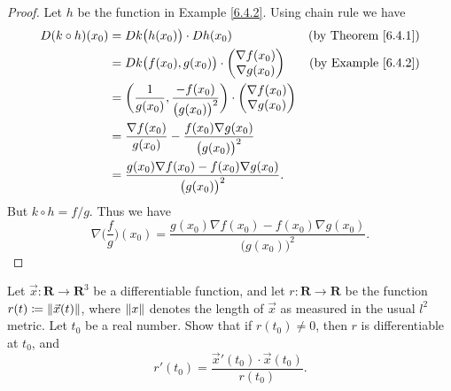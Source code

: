 \begin{proof}
    Let \(h\) be the function in Example \ref{6.4.2}.
    Using chain rule we have
    \begin{align*}
        D (k \circ h)(x_0) & = D k\big(h(x_0)\big) \cdot D h(x_0)                                                                & \text{(by Theorem \ref{6.4.1})} \\
                           & = D k\big(f(x_0), g(x_0)\big) \cdot \begin{pmatrix}
            \nabla f(x_0) \\
            \nabla g(x_0)
        \end{pmatrix}                                      & \text{(by Example \ref{6.4.2})} \\
                           & = \bigg(\frac{1}{g(x_0)}, \frac{-f(x_0)}{\big(g(x_0)\big)^2}\bigg) \cdot \begin{pmatrix}
            \nabla f(x_0) \\
            \nabla g(x_0)
        \end{pmatrix}                                   \\
                           & = \frac{\nabla f(x_0)}{g(x_0)} - \frac{f(x_0) \nabla g(x_0)}{\big(g(x_0)\big)^2}                                                      \\
                           & = \frac{g(x_0) \nabla f(x_0) - f(x_0) \nabla g(x_0)}{\big(g(x_0)\big)^2}.
    \end{align*}
    But \(k \circ h = f / g\).
    Thus we have
    \[
        \nabla \bigg(\frac{f}{g}\bigg)(x_0) = \frac{g(x_0) \nabla f(x_0) - f(x_0) \nabla g(x_0)}{\big(g(x_0)\big)^2}.
    \]
\end{proof}

\begin{exercise}\label{ex 6.4.5}
    Let \(\vec{x} : \mathbf{R} \to \mathbf{R}^3\) be a differentiable function, and let \(r : \mathbf{R} \to \mathbf{R}\) be the function \(r(t) \coloneqq \norm*{\vec{x}(t)}\), where \(\norm*{x}\) denotes the length of \(\vec{x}\) as measured in the usual \(l^2\) metric.
    Let \(t_0\) be a real number.
    Show that if \(r(t_0) \neq 0\), then \(r\) is differentiable at \(t_0\), and
    \[
        r'(t_0) = \frac{\vec{x}'(t_0) \cdot \vec{x}(t_0)}{r(t_0)}.
    \]
\end{exercise}